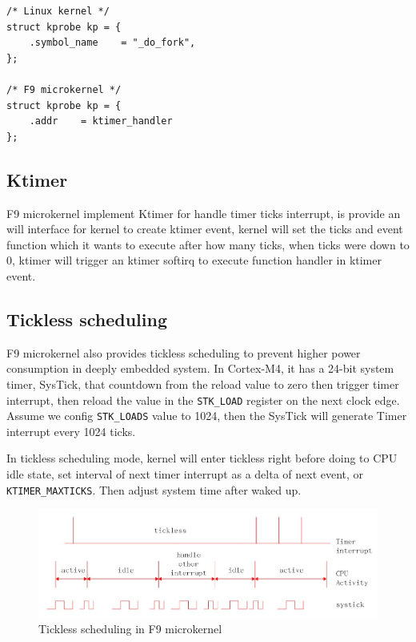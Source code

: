\documentclass[10pt,preprint,nocopyrightspace]{sigplanconf}
\begin{document}
\begin{lstlisting}[basicstyle=\small,frame=single]
/* Linux kernel */
struct kprobe kp = {
	.symbol_name    = "_do_fork",
};

/* F9 microkernel */
struct kprobe kp = {
	.addr    = ktimer_handler
};

\end{lstlisting}

\subsection{Ktimer}
F9 microkernel implement Ktimer for handle timer ticks interrupt, is provide an will interface for kernel to create ktimer event, kernel will set the ticks and event function which it wants to execute after how many ticks, when ticks were down to 0, ktimer will trigger an ktimer softirq to execute function handler in ktimer event.

\subsection{Tickless scheduling}

F9 microkernel also provides tickless scheduling to prevent higher power consumption in deeply embedded system\cite{freertos1,freertos2}. In Cortex-M4, it has a 24-bit system timer, SysTick, that countdown from the reload value to zero then trigger timer interrupt, then reload the value in the \verb|STK_LOAD| register on the next clock edge\cite{st2016manual}. Assume we config \verb|STK_LOADS| value to 1024, then the SysTick will generate Timer interrupt every 1024 ticks.

In tickless scheduling mode, kernel will enter tickless right before doing to CPU idle state, set interval of next timer interrupt as a delta of next event, or \verb|KTIMER_MAXTICKS|. Then adjust system time after waked up.

\begin{figure}[H]
	\begin{center}
		\includegraphics[width=\linewidth]{picture/tickless.png}
	\end{center}
	\caption{Tickless scheduling in F9 microkernel}
\end{figure}
\end{document}
